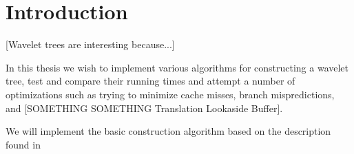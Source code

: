 \section{Introduction}
[Wavelet trees are interesting because...]

In this thesis we wish to implement various algorithms for constructing a wavelet tree, test and compare their running times and attempt a number of optimizations such as trying to minimize cache misses, branch mispredictions, and [SOMETHING SOMETHING Translation Lookaside Buffer].

We will implement the basic construction algorithm based on the description found in~\citep{ Navjda13}
